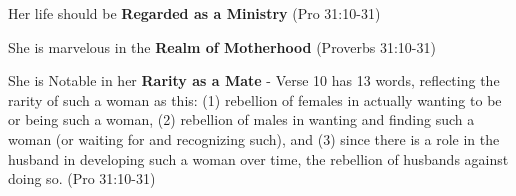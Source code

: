 \begin{compactenum}
    \item Her life should be \textbf{Regarded as a Ministry}   (Pro 31:10-31) 
    \item She is marvelous in the \textbf{Realm of Motherhood}   (Proverbs 31:10-31)  
    \item She is Notable in her \textbf{Rarity as a Mate} - Verse 10 has 13 words, reflecting the rarity of such a woman as this: (1) rebellion of females in actually wanting to be or being such a woman, (2) rebellion of males in wanting and finding such a woman (or waiting for and recognizing such), and (3) since there is a role in the husband in developing such a woman over time, the rebellion of husbands against doing so.  (Pro 31:10-31) 
\end{compactenum}

